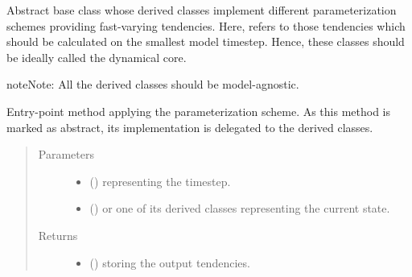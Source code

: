 \documentclass[letterpaper,10pt,english]{sphinxmanual}
\begin{document}

\begin{fulllineitems}
\label{\detokenize{api:parameterizations.fast_tendencies.FastTendency}}
Abstract base class whose derived classes implement different parameterization schemes
providing fast-varying tendencies. Here,  refers to those tendencies which
should be calculated on the smallest model timestep. Hence, these classes should be ideally
called  the dynamical core.

\begin{sphinxadmonition}{note}{Note:}
All the derived classes should be model-agnostic.
\end{sphinxadmonition}

\begin{fulllineitems}
\label{\detokenize{api:parameterizations.fast_tendencies.FastTendency.__call__}}
Entry-point method applying the parameterization scheme.
As this method is marked as abstract, its implementation is delegated to the derived classes.
\begin{quote}\begin{description}
\item[{Parameters}] \leavevmode\begin{itemize}
\item {} 
 () \textendash{}  representing the timestep.

\item {} 
 () \textendash{} {\hyperref[\detokenize{api:storages.grid_data.GridData}]{}} or one of its derived classes representing the current state.

\end{itemize}

\item[{Returns}] \leavevmode
\begin{itemize}
\item {} 
 () \textendash{} {\hyperref[\detokenize{api:storages.grid_data.GridData}]{}} storing the output tendencies.


\end{itemize}
\end{description}
\end{quote}
\end{fulllineitems}
\end{fulllineitems}
\end{document}
